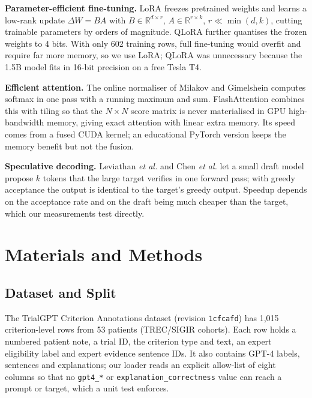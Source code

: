 \documentclass[conference]{IEEEtran}
\newcommand{\code}[1]{\texttt{\small #1}}
\begin{document}
\textbf{Parameter-efficient fine-tuning.} LoRA \cite{hu2022lora} freezes pretrained weights and learns a low-rank update $\Delta W = BA$ with $B\in\mathbb{R}^{d\times r}$, $A\in\mathbb{R}^{r\times k}$, $r\ll\min(d,k)$, cutting trainable parameters by orders of magnitude. QLoRA \cite{dettmers2023qlora} further quantises the frozen weights to 4 bits. With only 602 training rows, full fine-tuning would overfit and require far more memory, so we use LoRA; QLoRA was unnecessary because the 1.5B model fits in 16-bit precision on a free Tesla T4.

\textbf{Efficient attention.} The online normaliser of Milakov and Gimelshein \cite{milakov2018online} computes softmax in one pass with a running maximum and sum. FlashAttention \cite{dao2022flashattention} combines this with tiling so that the $N\times N$ score matrix is never materialised in GPU high-bandwidth memory, giving exact attention with linear extra memory. Its speed comes from a fused CUDA kernel; an educational PyTorch version keeps the memory benefit but not the fusion.

\textbf{Speculative decoding.} Leviathan \emph{et al.} \cite{leviathan2023fast} and Chen \emph{et al.} \cite{chen2023accelerating} let a small draft model propose $k$ tokens that the large target verifies in one forward pass; with greedy acceptance the output is identical to the target's greedy output. Speedup depends on the acceptance rate and on the draft being much cheaper than the target, which our measurements test directly.

\section{Materials and Methods}
\subsection{Dataset and Split}\label{sec:data}
The TrialGPT Criterion Annotations dataset \cite{trialgptdataset} (revision \code{1cfcafd}) has 1{,}015 criterion-level rows from 53 patients (TREC/SIGIR cohorts). Each row holds a numbered patient note, a trial ID, the criterion type and text, an expert eligibility label and expert evidence sentence IDs. It also contains GPT-4 labels, sentences and explanations; our loader reads an explicit allow-list of eight columns so that no \code{gpt4\_*} or \code{explanation\_correctness} value can reach a prompt or target, which a unit test enforces.
\end{document}
